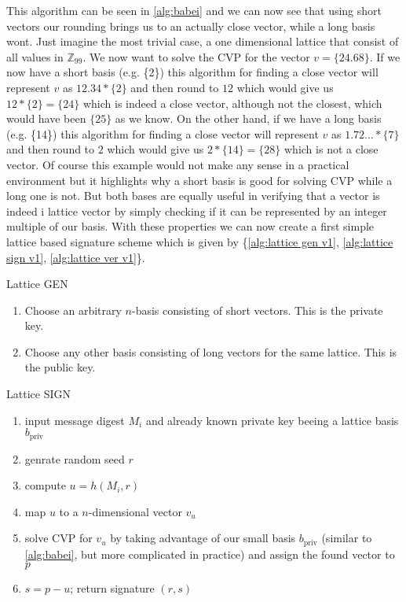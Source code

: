 \documentclass[conference]{IEEEtran}
\begin{document}
This algorithm can be seen in \ref{alg:babei} and we can now see that using short vectors our rounding brings us to an actually close vector, while a long basis wont.
Just imagine the most trivial case, a one dimensional lattice that consist of all values in $\mathbb{Z}_99$. We now want to solve the CVP for the vector $v= \{24.68\}$.
If we now have a short basis (e.g. \{2\}) this algorithm for finding a close vector will represent $v$ as $12.34*\{2\}$ and then round to $12$ which would give us $12*\{2\}=\{24\}$ which is indeed a close vector, although not the closest, which would have been $\{25\}$ as we know.
On the other hand, if we have a long basis (e.g. \{14\}) this algorithm for finding a close vector will represent $v$ as $1.72\dots*\{7\}$ and then round to $2$ which would give us $2*\{14\}=\{28\}$ which is not a close vector.
Of course this example would not make any sense in a practical environment but it highlights why a short basis is good for solving CVP while a long one is not.
But both bases are equally useful in verifying that a vector is indeed i lattice vector by simply checking if it can be represented by an integer multiple of our basis.
With these properties we can now create a first simple lattice based signature scheme which is given by \{\ref{alg:lattice gen v1}, \ref{alg:lattice sign v1}, \ref{alg:lattice ver v1}\}.

\begin{algorithm}
    \caption{Lattice GEN}\label{alg:lattice gen v1}
        \begin{enumerate}
            \item Choose an arbitrary $n$-basis consisting of short vectors. This is the private key.
            \item Choose any other basis consisting of long vectors for the same lattice. This is the public key. %
        \end{enumerate}
    \end{algorithm}

\begin{algorithm}
    \caption{Lattice SIGN}\label{alg:lattice sign v1}
        \begin{enumerate}
            \item input message digest $M_i$ and already known private key beeing a lattice basis $b_\text{priv}$
            \item genrate random seed $r$
            \item compute $u=h(M_i,r)$
            \item map $u$ to a $n$-dimensional vector $v_u$
            \item solve CVP for $v_u$ by taking advantage of our small basis $b_\text{priv}$ (similar to \ref{alg:babei}, but more complicated in practice) and assign the found vector to $p$
            \item $s=p-u$; return signature $(r,s)$
        \end{enumerate}
    \end{algorithm}
\end{document}
